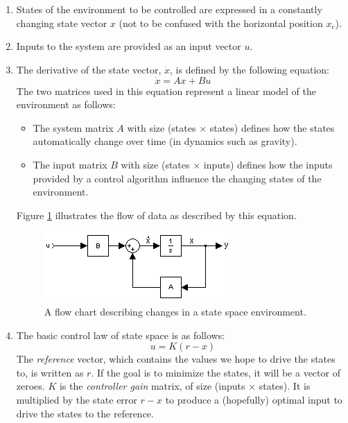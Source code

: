 \documentclass[12pt]{article}
\begin{document}
\begin{enumerate}
    \item States of the environment to be controlled are expressed in a constantly changing state vector $x$ (not to be confused with the horizontal position $x _c$).
    \item Inputs to the system are provided as an input vector $u$.
    \item The derivative of the state vector, $\dot x$, is defined by the following equation:
        \begin{equation} \label{state_derivative}
            \dot x = A x + B u
        \end{equation}
        The two matrices used in this equation represent a linear model of the environment as follows:
        \begin{itemize}
            \item The system matrix $A$ with size (states $\times$ states) defines how the states automatically change over time (in dynamics such as gravity).
            \item The input matrix $B$ with size (states $\times$ inputs) defines how the inputs provided by a control algorithm influence the changing states of the environment.
        \end{itemize}
        Figure \ref{state_space} illustrates the flow of data as described by this equation.
        \begin{figure}[ht]
            \centering
            \includegraphics[width=\textwidth]{state_space}
            \caption{\label{state_space} A flow chart describing changes in a state space environment.}
        \end{figure}
    \item The basic control law of state space is as follows:
        \begin{equation} \label{control_law}
            u = K(r - x)
        \end{equation}
        The \textit{reference} vector, which contains the values we hope to drive the states to, is written as $r$. If the goal is to minimize the states, it will be a vector of zeroes. $K$ is the \textit{controller gain} matrix, of size (inputs $\times$ states). It is multiplied by the state error $r - x$ to produce a (hopefully) optimal input to drive the states to the reference.
\end{enumerate}
\end{document}
